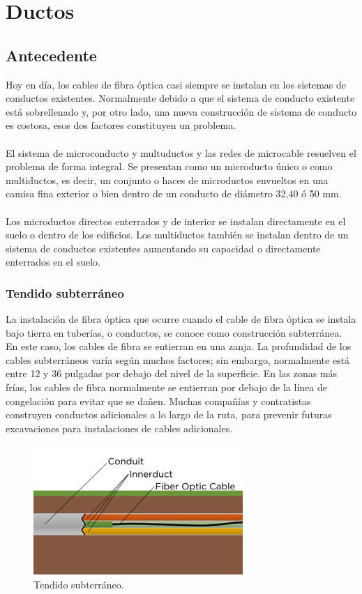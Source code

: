 \documentclass[12pt,letterpaper]{article}
\begin{document}
\newpage
\section{Ductos}
\subsection{Antecedente}
Hoy en día, los cables de fibra óptica casi siempre se instalan en los sistemas de 
conductos existentes. Normalmente debido a que el sistema de conducto existente está 
sobrellenado y, por otro lado, una nueva construcción de sistema de conducto es costosa, 
esos dos factores constituyen un problema.
\\ \\
El sistema de microconducto y multuductos y las redes de microcable resuelven el problema 
de forma integral. Se presentan como un microducto único o como multiductos, es decir, un 
conjunto o haces de microductos envueltos en una camisa fina exterior o bien dentro de un 
conducto de diámetro 32,40 ó 50 mm.
\\ \\
Los microductos directos enterrados y de interior se instalan directamente en el suelo o 
dentro de los edificios. Los multiductos también se instalan dentro de un sistema de 
conductos existentes aumentando su capacidad o directamente enterrados en el suelo.

\subsubsection{Tendido subterráneo}
La instalación de fibra óptica que ocurre cuando el cable de fibra óptica se instala bajo 
tierra en tuberías, o conductos, se conoce como construcción subterránea. En este caso, los 
cables de fibra se entierran en una zanja. La profundidad de los cables subterráneos varía 
según muchos factores; sin embargo, normalmente está entre 12 y 36 pulgadas por debajo del 
nivel de la superficie. En las zonas más frías, los cables de fibra normalmente se entierran 
por debajo de la línea de congelación para evitar que se dañen. Muchas compañías y 
contratistas construyen conductos adicionales a lo largo de la ruta, para prevenir futuras 
excavaciones para instalaciones de cables adicionales.
\begin{figure}[ht]
    \centering
    \includegraphics[width=.5\textwidth]{f11.png}
    \caption{Tendido subterráneo.}
\end{figure}
\end{document}
